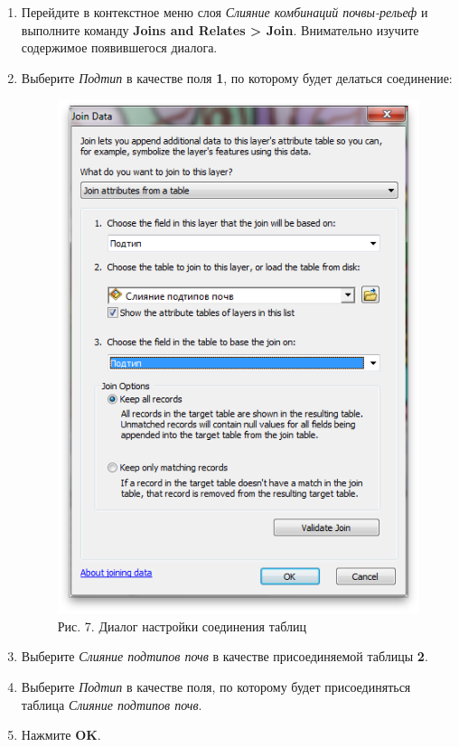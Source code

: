 \documentclass[]{book}
\theoremstyle{definition}
\theoremstyle{definition}
\theoremstyle{definition}
\theoremstyle{remark}
\begin{document}
\begin{enumerate}
\def\labelenumi{\arabic{enumi}.}
\item
  Перейдите в контекстное меню слоя \emph{Слияние комбинаций
  почвы-рельеф} и выполните команду \textbf{Joins and Relates
  \textgreater{} Join}. Внимательно изучите содержимое появившегося
  диалога.
\item
  Выберите \emph{Подтип} в качестве поля \textbf{1}, по которому будет
  делаться соединение:

  \begin{figure}
  \centering
  \includegraphics{images/Ex10/image12.png}
  \caption{Рис. 7. Диалог настройки соединения таблиц}
  \end{figure}
\item
  Выберите \emph{Слияние подтипов почв} в качестве присоединяемой
  таблицы \textbf{2}.
\item
  Выберите \emph{Подтип} в качестве поля, по которому будет
  присоединяться таблица \emph{Слияние подтипов почв}.
\item
  Нажмите \textbf{OK}.
\end{enumerate}
\end{document}
